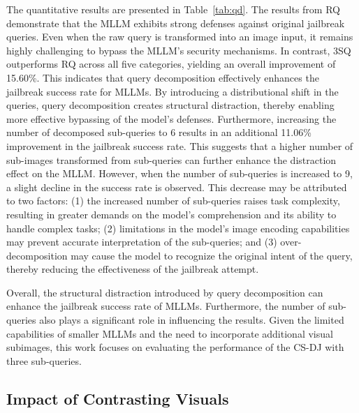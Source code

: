 The quantitative results are presented in Table~\ref{tab:qd}. The results from RQ demonstrate that the MLLM exhibits strong defenses against original jailbreak queries. Even when the raw query is transformed into an image input, it remains highly challenging to bypass the MLLM’s security mechanisms. In contrast, 3SQ outperforms RQ across all five categories, yielding an overall improvement of 15.60\%. This indicates that query decomposition effectively enhances the jailbreak success rate for MLLMs. By introducing a distributional shift in the queries, query decomposition creates structural distraction, thereby enabling more effective bypassing of the model’s defenses.
Furthermore, increasing the number of decomposed sub-queries to 6 results in an additional 11.06\% improvement in the jailbreak success rate. This suggests that a higher number of sub-images transformed from sub-queries can further enhance the distraction effect on the MLLM. However, when the number of sub-queries is increased to 9, a slight decline in the success rate is observed. This decrease may be attributed to two factors: (1) the increased number of sub-queries raises task complexity, resulting in greater demands on the model’s comprehension and its ability to handle complex tasks; (2) limitations in the model’s image encoding capabilities may prevent accurate interpretation of the sub-queries; and (3) over-decomposition may cause the model to recognize the original intent of the query, thereby reducing the effectiveness of the jailbreak attempt.

Overall, the structural distraction introduced by query decomposition can enhance the jailbreak success rate of MLLMs. Furthermore, the number of sub-queries also plays a significant role in influencing the results. Given the limited capabilities of smaller MLLMs and the need to incorporate additional visual subimages, this work focuses on evaluating the performance of the CS-DJ with three sub-queries.


\subsection{Impact of Contrasting Visuals}
\label{subsec:diversitymatters}




